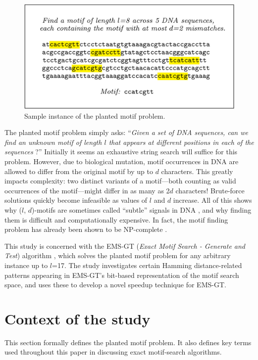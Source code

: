 \documentclass[oneside,12pt]{DISCSthesis}
\begin{document}
		\begin{figure}[h] \label{fig:example}
			\centering
			\includegraphics[width=5.5in]{img/example}
			\caption{Sample instance of the planted motif problem.}
			\end{figure}

		The planted motif problem simply asks: ``\emph{Given a set of DNA sequences, can we find an unknown motif of length $l$ that appears at different positions in each of the sequences} \cite{pevzner2000combinatorial}?'' Initially it seems an exhaustive string search will suffice for this problem. However, due to biological mutation, motif occurrences in DNA are allowed to differ from the original motif by up to $d$ characters. This greatly impacts complexity: two distinct variants of a motif---both counting as valid occurrences of the motif---might differ in as many as 2$d$ characters! Brute-force solutions quickly become infeasible as values of $l$ and $d$ increase. All of this shows why ($l$, $d$)-motifs are sometimes called ``subtle'' signals in DNA  \cite{pevzner2000combinatorial}, and why finding them is difficult and computationally expensive. In fact, the motif finding problem has already been shown to be NP-complete \cite{pms2014}. 

		This study is concerned with the EMS-GT (\emph{Exact Motif Search - Generate and Test}) algorithm \cite{nabos2015dissertation}, which solves the planted motif problem for any arbitrary instance up to $l$=17. The study investigates certain Hamming distance-related patterns appearing in EMS-GT's bit-based representation of the motif search space, and uses these to develop a novel speedup technique for EMS-GT.
		\newpage

	\section{Context of the study}
		This section formally defines the planted motif problem. It also defines key terms used throughout this paper in discussing exact motif-search algorithms.\vspace{5mm}
\end{document}
